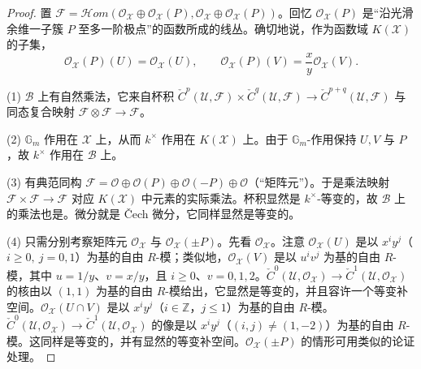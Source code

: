 \begin{proof}
置 $\mathcal{F}=\mathcal{H}om(\mathcal{O}_{\mathcal{X}}\oplus\mathcal{O}_{\mathcal{X}}(P),\mathcal{O}_{\mathcal{X}}\oplus\mathcal{O}_{\mathcal{X}}(P))$。回忆 $\mathcal{O}_{\mathcal{X}}(P)$ 是“沿光滑余维一子簇 $P$ 至多一阶极点”的函数所成的线丛。确切地说，作为函数域 $K(\mathcal{X})$ 的子集，
\[
\mathcal{O}_{\mathcal{X}}(P)(U)=\mathcal{O}_{\mathcal{X}}(U),\qquad
\mathcal{O}_{\mathcal{X}}(P)(V)=\frac{x}{y}\mathcal{O}_{\mathcal{X}}(V).
\]

(1) $\mathcal{B}$ 上有自然乘法，它来自杯积 $\check{C}^p(\mathcal{U},\mathcal{F})\times\check{C}^q(\mathcal{U},\mathcal{F})\to\check{C}^{p+q}(\mathcal{U},\mathcal{F})$ 与同态复合映射 $\mathcal{F}\otimes\mathcal{F}\to\mathcal{F}$。

(2) $\mathbb{G}_m$ 作用在 $\mathcal{X}$ 上，从而 $k^{\times}$ 作用在 $K(\mathcal{X})$ 上。由于 $\mathbb{G}_m$-作用保持 $U,V$ 与 $P$，故 $k^{\times}$ 作用在 $\mathcal{B}$ 上。

(3) 有典范同构 $\mathcal{F}=\mathcal{O}\oplus\mathcal{O}(P)\oplus\mathcal{O}(-P)\oplus\mathcal{O}$（“矩阵元”）。于是乘法映射 $\mathcal{F}\times\mathcal{F}\to\mathcal{F}$ 对应 $K(\mathcal{X})$ 中元素的实际乘法。杯积显然是 $k^{\times}$-等变的，故 $\mathcal{B}$ 上的乘法也是。微分就是 Čech 微分，它同样显然是等变的。

(4) 只需分别考察矩阵元 $\mathcal{O}_{\mathcal{X}}$ 与 $\mathcal{O}_{\mathcal{X}}(\pm P)$。先看 $\mathcal{O}_{\mathcal{X}}$。注意 $\mathcal{O}_{\mathcal{X}}(U)$ 是以 $x^iy^j$（$i\ge0,\ j=0,1$）为基的自由 $R$-模；类似地，$\mathcal{O}_{\mathcal{X}}(V)$ 是以 $u^iv^j$ 为基的自由 $R$-模，其中 $u=1/y$、$v=x/y$，且 $i\ge0$、$v=0,1,2$。$\check{C}^0(\mathcal{U},\mathcal{O}_{\mathcal{X}})\to\check{C}^1(\mathcal{U},\mathcal{O}_{\mathcal{X}})$ 的核由以 $(1,1)$ 为基的自由 $R$-模给出，它显然是等变的，并且容许一个等变补空间。$\mathcal{O}_{\mathcal{X}}(U\cap V)$ 是以 $x^iy^j$（$i\in\mathbb{Z}$，$j\le1$）为基的自由 $R$-模。$\check{C}^0(\mathcal{U},\mathcal{O}_{\mathcal{X}})\to\check{C}^1(\mathcal{U},\mathcal{O}_{\mathcal{X}})$ 的像是以 $x^iy^j$（$(i,j)\neq(1,-2)$）为基的自由 $R$-模。这同样是等变的，并有显然的等变补空间。$\mathcal{O}_{\mathcal{X}}(\pm P)$ 的情形可用类似的论证处理。



\end{proof}

